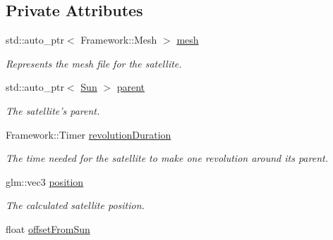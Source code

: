 \subsection*{Private Attributes}
\begin{DoxyCompactItemize}
\item 
\hypertarget{class_satellite_a00e43093535d9107b9c3e5911a78b9e6}{std\-::auto\-\_\-ptr$<$ Framework\-::\-Mesh $>$ \hyperlink{class_satellite_a00e43093535d9107b9c3e5911a78b9e6}{mesh}}\label{class_satellite_a00e43093535d9107b9c3e5911a78b9e6}

\begin{DoxyCompactList}\small\item\em Represents the mesh file for the satellite. \end{DoxyCompactList}\item 
\hypertarget{class_satellite_a4ad51c61fd80af0ae2012156046bc6f1}{std\-::auto\-\_\-ptr$<$ \hyperlink{class_sun}{Sun} $>$ \hyperlink{class_satellite_a4ad51c61fd80af0ae2012156046bc6f1}{parent}}\label{class_satellite_a4ad51c61fd80af0ae2012156046bc6f1}

\begin{DoxyCompactList}\small\item\em The satellite's parent. \end{DoxyCompactList}\item 
\hypertarget{class_satellite_a7e295ead1d57fa33491d544b316b7419}{Framework\-::\-Timer \hyperlink{class_satellite_a7e295ead1d57fa33491d544b316b7419}{revolution\-Duration}}\label{class_satellite_a7e295ead1d57fa33491d544b316b7419}

\begin{DoxyCompactList}\small\item\em The time needed for the satellite to make one revolution around its parent. \end{DoxyCompactList}\item 
\hypertarget{class_satellite_a924a136220bcab117d5c61781a287df7}{glm\-::vec3 \hyperlink{class_satellite_a924a136220bcab117d5c61781a287df7}{position}}\label{class_satellite_a924a136220bcab117d5c61781a287df7}

\begin{DoxyCompactList}\small\item\em The calculated satellite position. \end{DoxyCompactList}\item 
\hypertarget{class_satellite_a3a9cf936be8fdd647e501b048ef6031f}{float \hyperlink{class_satellite_a3a9cf936be8fdd647e501b048ef6031f}{offset\-From\-Sun}}\label{class_satellite_a3a9cf936be8fdd647e501b048ef6031f}


\end{DoxyCompactItemize}
